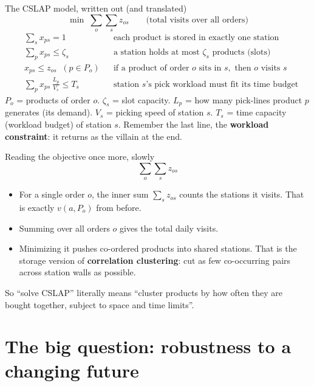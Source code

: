\documentclass[11pt,aspectratio=169]{beamer}
\newcommand{\term}[1]{\textcolor{blue!60!black}{\textbf{#1}}}
\begin{document}
\begin{frame}{The CSLAP model, written out (and translated)}
  \[
  \min \; \sum_{o}\sum_{s} z_{os} \qquad\text{(total visits over all orders)}
  \]
  \vspace{-2mm}
  \begin{align*}
  &\sum_{s} x_{ps} = 1 &&\text{each product is stored in exactly one station}\\
  &\sum_{p} x_{ps} \le \zeta_s &&\text{a station holds at most }\zeta_s\text{ products (slots)}\\
  &x_{ps} \le z_{os} \;\;(p\in P_o)&&\text{if a product of order }o\text{ sits in }s,\text{ then }o\text{ visits }s\\
  &\sum_{p} x_{ps}\,\tfrac{L_p}{V_s} \le T_s &&\text{station }s\text{'s pick workload must fit its time budget}
  \end{align*}
  \footnotesize
  $P_o$ = products of order $o$. $\zeta_s$ = slot capacity. $L_p$ = how many pick-lines product $p$ generates (its demand). $V_s$ = picking speed of station $s$. $T_s$ = time capacity (workload budget) of station $s$. Remember the last line, the \term{workload constraint}: it returns as the villain at the end.
\end{frame}

\begin{frame}{Reading the objective once more, slowly}
  \[
  \sum_{o}\sum_{s} z_{os}
  \]
  \begin{itemize}
    \item For a single order $o$, the inner sum $\sum_s z_{os}$ counts the stations it visits. That is exactly $v(a,P_o)$ from before.
    \item Summing over all orders $o$ gives the total daily visits.
    \item Minimizing it pushes co-ordered products into shared stations. That is the storage version of \term{correlation clustering}: cut as few co-occurring pairs across station walls as possible.
  \end{itemize}
  So ``solve CSLAP'' literally means ``cluster products by how often they are bought together, subject to space and time limits''.
\end{frame}

\section{The big question: robustness to a changing future}
\end{document}
